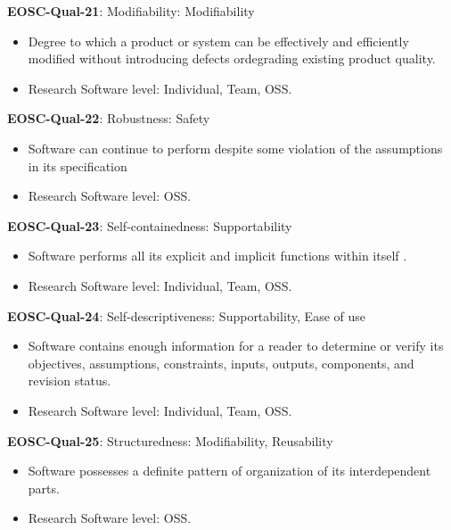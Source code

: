 \textbf{EOSC-Qual-21}: Modifiability: Modifiability

\begin{itemize}
    \item Degree to which a product or system can be effectively and efficiently modified without introducing defects ordegrading existing product quality. \cite{iso_25010_2011_2017,boehm_quantitative_1976}
    \item Research Software level: Individual, Team, OSS.
\end{itemize}

\textbf{EOSC-Qual-22}: Robustness: Safety

\begin{itemize}
    \item Software can continue to perform despite some violation of the assumptions in its specification \cite{boehm_quantitative_1976}
    \item Research Software level: OSS.
\end{itemize}

\textbf{EOSC-Qual-23}: Self-containedness: Supportability

\begin{itemize}
    \item Software performs all its explicit and implicit functions within itself . \cite{boehm_quantitative_1976}
    \item Research Software level: Individual, Team, OSS.
\end{itemize}

\textbf{EOSC-Qual-24}: Self-descriptiveness: Supportability, Ease of use

\begin{itemize}
    \item Software contains enough information for a reader to determine or verify its objectives, assumptions, constraints, inputs, outputs, components, and revision status. \cite{boehm_quantitative_1976}
    \item Research Software level: Individual, Team, OSS.
\end{itemize}

\textbf{EOSC-Qual-25}: Structuredness: Modifiability, Reusability

\begin{itemize}
    \item Software possesses a definite pattern of organization of its interdependent parts. \cite{boehm_quantitative_1976}
    \item Research Software level: OSS.
\end{itemize}


